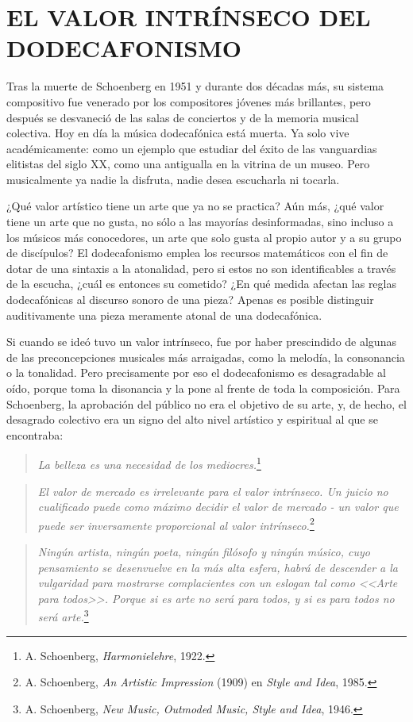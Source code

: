      
	\section{EL VALOR INTRÍNSECO DEL DODECAFONISMO}
	Tras la muerte de Schoenberg en 1951 y durante dos décadas más, su sistema compositivo fue venerado por los compositores jóvenes más brillantes, pero después se desvaneció de las salas de conciertos y de la memoria musical colectiva. Hoy en día la música dodecafónica está muerta. Ya solo vive académicamente: como un ejemplo que estudiar del éxito de las vanguardias elitistas del siglo XX, como una antigualla en la vitrina de un museo. Pero musicalmente ya nadie la disfruta, nadie desea escucharla ni tocarla.
	
	¿Qué valor artístico tiene un arte que ya no se practica? Aún más, ¿qué valor tiene un arte que no gusta, no sólo a las mayorías desinformadas, sino incluso a los músicos más conocedores, un arte que solo gusta al propio autor y a su grupo de discípulos? El dodecafonismo emplea los recursos matemáticos con el fin de dotar de una sintaxis a la atonalidad, pero si estos no son identificables a través de la escucha, ¿cuál es entonces su cometido? ¿En qué medida afectan las reglas dodecafónicas al discurso sonoro de una pieza? Apenas es posible distinguir auditivamente una pieza meramente atonal de una dodecafónica. \cite{basomba}
	
	Si cuando se ideó tuvo un valor intrínseco, fue por haber prescindido de algunas de las preconcepciones musicales más arraigadas, como la melodía, la consonancia o la tonalidad. Pero precisamente por eso el dodecafonismo es desagradable al oído, porque toma la disonancia y la pone al frente de toda la composición. Para Schoenberg, la aprobación del público no era el objetivo de su arte, y, de hecho, el desagrado colectivo era un signo del alto nivel artístico y espiritual al que se encontraba:
	
	\begin{quote}
		\emph{La belleza es una necesidad de los mediocres.}\footnote{A. Schoenberg, \emph{Harmonielehre}, 1922.}
	\end{quote}
	\begin{quote}
		\emph{El valor de mercado es irrelevante para el valor intrínseco. Un juicio no cualificado puede como máximo decidir el valor de mercado - un valor que puede ser inversamente proporcional al valor intrínseco.}\footnote{A. Schoenberg, \emph{An Artistic Impression} (1909) en \emph{Style and Idea}, 1985.}
	\end{quote}
	\begin{quote}
		\emph{Ningún artista, ningún poeta, ningún filósofo y ningún músico, cuyo pensamiento se desenvuelve en la más alta esfera, habrá de descender a la vulgaridad para mostrarse complacientes con un eslogan tal como <<Arte para todos>>. Porque si es arte no será para todos, y si es para todos no será arte.}\footnote{A. Schoenberg, \emph{New Music, Outmoded Music, Style and Idea}, 1946.}
	\end{quote}
	
